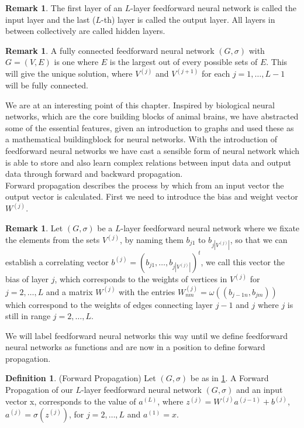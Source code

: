 \documentclass{article}
\theoremstyle{definition}
\newtheorem{definition}[theorem]{Definition}
\newtheorem{remark}[theorem]{Remark}
\begin{document}
\begin{remark}
The first layer of an $L$-layer feedforward neural network is called the input layer and the last ($L$-th) layer is called the output layer. All layers in between collectively are called hidden layers.
\end{remark}

\begin{remark}
A fully connected feedforward neural network $(G, \sigma)$ with $G = (V, E)$ is one where $E$ is the largest out of every possible sets of $E$. This will give the unique solution, where $V^{(j)}$ and $V^{(j+1)}$ for each $j = 1, \dots , L-1$ will be fully connected.
\end{remark}

We are at an interesting point of this chapter. Inspired by biological neural networks, which are the core building blocks of animal brains, we have abstracted some of the essential features, given an introduction to graphs and used these as a mathematical buildingblock for neural networks.
With the introduction of feedforward neural networks we have cast a sensible form of neural network which is able to store and also learn complex relations between input data and output data through forward and backward propagation. \\
Forward propagation describes the process by which from an input vector the output vector is calculated. First we need to introduce the bias and weight vector $W^{(j)}$.

\begin{remark}\label{standardGraphLabeling}
Let $(G, \sigma)$ be a $L$-layer feedforward neural network where we fixate the elements from the sets $V^{(j)}$, by naming them $b_{j1}$ to $b_{j|V^{(j)}|}$, so that we can establish a correlating vector $b^{(j)} = (b_{j1}, \dots ,b_{j|V^{(j)}|})^{t}$, we call this vector the bias of layer $j$, which corresponds to the weights of vertices in $V^{(j)}$ for $j = 2, \dots , L$ and a matrix $W^{(j)}$ with the entries $W^{(j)}_{nm} = \omega((b_{j-1n}, b_{jm}))$ which correspond to the weights of edges connecting layer $j-1$ and $j$ where $j$ is still in range $j = 2, \dots , L$.
\end{remark}

We will label feedforward neural networks this way until we define feedforward neural networks as functions and are now in a position to define forward propagation.

\begin{definition}(Forward Propagation)
\label{def:forward_propagation}
Let $(G, \sigma)$ be as in \ref{standardGraphLabeling}. A Forward Propagation of our $L$-layer feedforward neural network $(G, \sigma)$ and an input vector x, corresponds to the value of $a^{(L)}$, where $z^{(j)} = W^{(j)} a^{(j-1)} + b^{(j)}$, $a^{(j)} = \sigma(z^{(j)})$, for $j=2, \dots , L$ and $a^{(1)} = x$.
\end{definition}
\end{document}
